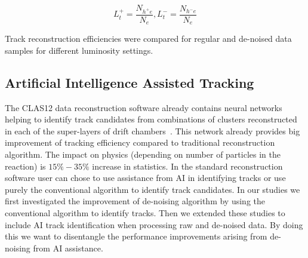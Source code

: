 \begin{equation}
L_t^+ = \frac{N_{h^+e}}{N_e} , L_t^- = \frac{N_{h^-e}}{N_e} 
\label{eq::eff}
\end{equation}

Track reconstruction efficiencies were compared for regular and de-noised data samples for different luminosity settings.

\subsection{Artificial Intelligence Assisted Tracking}

The CLAS12 data reconstruction software already contains neural networks helping to identify track candidates from combinations of clusters reconstructed in each of the super-layers of drift chambers~\cite{Gavalian:2022mlp}.
This network already provides big improvement of tracking efficiency compared to traditional reconstruction algorithm. The impact on physics (depending on number of particles in the reaction) is $15\%-35\%$ increase in statistics. 
In the standard reconstruction software user can chose to use assistance from AI in identifying tracks or use purely the conventional algorithm to identify track candidates. In our studies we first investigated the improvement of de-noising algorithm by using the conventional algorithm to identify tracks. Then we extended these studies to include AI track identification when processing raw and de-noised data. By doing this we want to disentangle the performance improvements arising from de-noising from AI assistance. 


 
